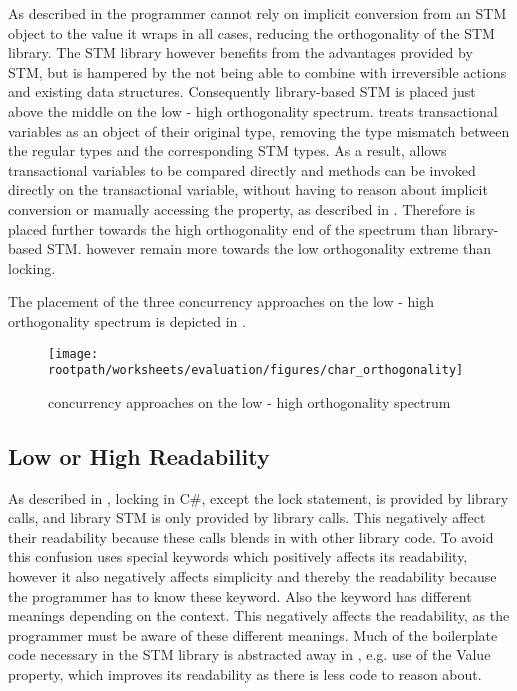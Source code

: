 As described in  the programmer cannot rely on implicit conversion from an \ac{STM} object to the value it wraps in all cases, reducing the orthogonality of the \ac{STM} library. The \ac{STM} library however benefits from the advantages provided by \ac{STM}, but is hampered by the not being able to combine with irreversible actions and existing data structures. Consequently library-based \ac{STM} is placed just above the middle on the low - high orthogonality spectrum. \stmnamesp treats transactional variables as an object of their original type, removing the type mismatch between the regular types and the corresponding \ac{STM} types. As a result, \stmname allows transactional variables to be compared directly and methods can be invoked directly on the transactional variable, without having to reason about implicit conversion or manually accessing the  property, as described in . Therefore \stmname is placed further towards the high orthogonality end of the spectrum than library-based \ac{STM}. \stmname however remain more towards the low orthogonality extreme than locking.

The placement of the three concurrency approaches on the low - high orthogonality spectrum is depicted in .


\begin{figure}[htbp]
\centering
\texttt{[image: \\rootpath/worksheets/evaluation/figures/char\_orthogonality]}
\caption{concurrency approaches on the low - high orthogonality spectrum}
\label{fig:char_orthogonality}
\end{figure}

\subsection{Low or High Readability}\label{subsec:char_readability}
As described in , locking in C\#, except the lock statement, is provided by library calls, and library \ac{STM} is only provided by library calls. This negatively affect their readability because these calls blends in with other library code. To avoid this confusion \stmname uses special keywords which positively affects its readability, however it also negatively affects simplicity and thereby the readability because the programmer has to know these keyword. Also the  keyword has different meanings depending on the context. This negatively affects the readability, as the programmer must be aware of these different meanings. Much of the boilerplate code necessary in the \ac{STM} library is abstracted away in \stmname, e.g. use of the Value property, which improves its readability as there is less code to reason about.

